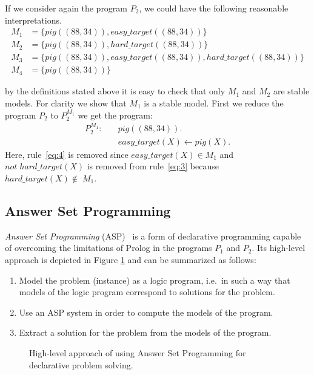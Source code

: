If we consider again the program \(P_2\), we could have the following reasonable interpretations.
\begin{align*}
M_1&= \{pig((88,34)), \mathit{easy\_target}((88,34))\}  \\
M_2&= \{pig((88,34)), \mathit{hard\_target}((88,34))\} \\
M_3&= \{pig((88,34)), \mathit{easy\_target}((88,34)), \mathit{hard\_target}((88,34))\} \\
M_4&= \{pig((88,34))\}
\end{align*}

by the definitions stated above it is easy to check that only \(M_1\) and \(M_2\) are stable models. For clarity we show that \(M_1\) is a stable model. First we reduce the program \(P_2\) to \(P_2^{M_1}\) we get the program:
\begin{align}
P_2^{M_1} \colon \quad
&pig((88,34)). \\
&\mathit{easy\_target}(X) \leftarrow pig(X). 
\end{align}
Here, rule~\eqref{eq:4} is removed since \(\mathit{easy\_target}(X) \in M_1\) and \(not\; \mathit{hard\_target}(X)\) is removed from rule~\eqref{eq:3} because \(\mathit{hard\_target}(X) \notin\; M_1\).
\subsection{Answer Set Programming}

\emph{Answer Set Programming} (ASP)~\cite{aspPrime} is a form of declarative programming 
capable of overcoming the limitations of Prolog in the programs \(P_1\) and \(P_2\).
Its high-level approach is depicted in Figure \ref{fig:ASP1} and can be summarized as follows:
\begin{enumerate}
\item Model the problem (instance) as a logic program, i.e.~in such a way that models of the logic program correspond to solutions for the problem.
\item Use an ASP system in order to compute the models of the program.
\item Extract a solution for the problem from the models of the program.
\end{enumerate}
\begin{figure}
  \caption{High-level approach of using Answer Set Programming for declarative problem solving.}
  \begin{center}
  \end{center}
  \label{fig:ASP1}
\end{figure}
 

